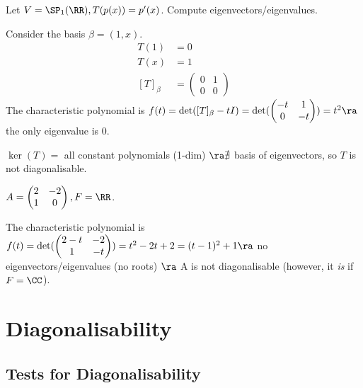 \documentclass[11pt]{scrartcl}
\begin{document}
\begin{example}

  Let \(V = \SP_{1}(\RR), T(p(x)) = p'(x)\). Compute eigenvectors/eigenvalues.

  \begin{soln}
    Consider the basis \(\beta = (1, x)\).
    \begin{align}
      T(1) &= 0\\
      T(x) &= 1\\
      [T]_{\beta} &= \begin{pmatrix}
        0 & 1\\
        0 & 0
      \end{pmatrix}
    \end{align}
    The characteristic polynomial is \(f(t) = \det([T]_{\beta} - tI) = \det(\begin{pmatrix}
      -t & 1\\
      0 & -t
    \end{pmatrix}) = t^{2} \ra\) the only eigenvalue is \(0\).

    \(\ker(T) = \) all constant polynomials (1-dim)
    \(\ra \nexists\) basis of eigenvectors, so \(T\) is not
    diagonalisable.
  \end{soln}
\end{example}
\begin{example}


  \(A = \begin{pmatrix}
    2 & -2\\
    1 & 0
  \end{pmatrix}, F = \RR\).

  The characteristic polynomial is \(f(t) = \det(\begin{pmatrix}
    2-t & -2\\
    1 & -t
  \end{pmatrix}) = t^{2} -2t +2 = (t-1)^{2}+1 \ra \) no
  eigenvectors/eigenvalues (no roots) \(\ra\) A is not diagonalisable
  (however, it \emph{is} if \(F=\CC\)).
\end{example}

\section{Diagonalisability}
\label{sec:dia}

\subsection{Tests for Diagonalisability}
\label{subsec:tests}
\end{document}
